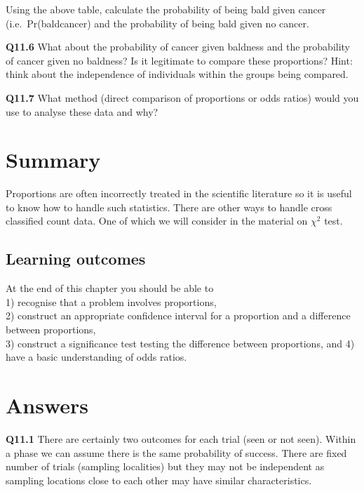 \documentclass[
  oneside]{krantz}
\begin{document}
Using the above table, calculate the probability of being bald given cancer (i.e.~Pr(bald\textbar cancer) and the probability of being bald given no cancer.

\textbf{Q11.6} What about the probability of cancer given baldness and the probability of cancer given no baldness? Is it legitimate to compare these proportions? Hint: think about the independence of individuals within the groups being compared.

\textbf{Q11.7} What method (direct comparison of proportions or odds ratios) would you use to analyse these data and why?

\hypertarget{SUMprop}{%
\section{Summary}\label{SUMprop}}

Proportions are often incorrectly treated in the scientific literature so it is useful to know how to handle such statistics. There are other ways to handle cross classified count data. One of which we will consider in the material on \(\chi^{2}\) test.

\hypertarget{learning-outcomes-6}{%
\subsection{Learning outcomes}\label{learning-outcomes-6}}

At the end of this chapter you should be able to\\
1) recognise that a problem involves proportions,\\
2) construct an appropriate confidence interval for a proportion and a difference between proportions,\\
3) construct a significance test testing the difference between proportions, and
4) have a basic understanding of odds ratios.

\hypertarget{ANSprop}{%
\section{Answers}\label{ANSprop}}

\textbf{Q11.1} There are certainly two outcomes for each trial (seen or not seen). Within a phase we can assume there is the same probability of success. There are fixed number of trials (sampling localities) but they may not be independent as sampling locations close to each other may have similar characteristics.
\end{document}
